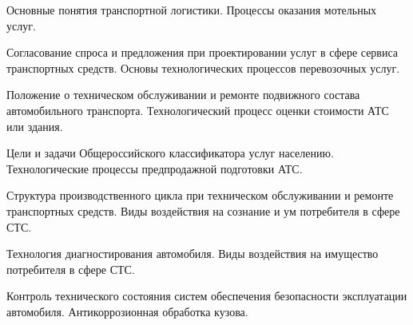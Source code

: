 \documentclass[
	14pt,
	a4paper,
	]
	{scrartcl}
\begin{document}
\vfill

\newpage


\shapk
{}
\setcounter{zad}{0}

\vfill
\z Основные понятия транспортной логистики.
 \vfill
\z Процессы оказания мотельных услуг.
 \vfill

\vfill

\newpage


\shapk
{}
\setcounter{zad}{0}

\vfill
\z Согласование спроса и предложения при проектировании услуг в сфере сервиса транспортных средств.
 \vfill
\z Основы технологических процессов перевозочных услуг.
 \vfill

\vfill

\newpage


\shapk
{}
\setcounter{zad}{0}

\vfill
\z Положение о техническом обслуживании и ремонте подвижного состава автомобильного транспорта.
 \vfill
\z Технологический процесс оценки стоимости АТС или здания.
 \vfill

\vfill

\newpage


\shapk
{}
\setcounter{zad}{0}

\vfill
\z Цели и задачи Общероссийского классификатора услуг населению.
 \vfill
\z Технологические процессы предпродажной подготовки АТС.
 \vfill

\vfill

\newpage


\shapk
{}
\setcounter{zad}{0}

\vfill
\z Структура производственного цикла при техническом обслуживании и ремонте транспортных средств.
 \vfill
\z Виды воздействия на сознание и ум потребителя в сфере СТС.
 \vfill

\vfill

\newpage


\shapk
{}
\setcounter{zad}{0}

\vfill
\z Технология диагностирования  автомобиля.
 \vfill
\z Виды воздействия на имущество потребителя в сфере СТС. 
 \vfill

\vfill

\newpage


\shapk
{}
\setcounter{zad}{0}

\vfill
\z Контроль технического состояния систем обеспечения безопасности эксплуатации автомобиля.
 \vfill
\z Антикоррозионная обработка кузова.
 \vfill
\end{document}
